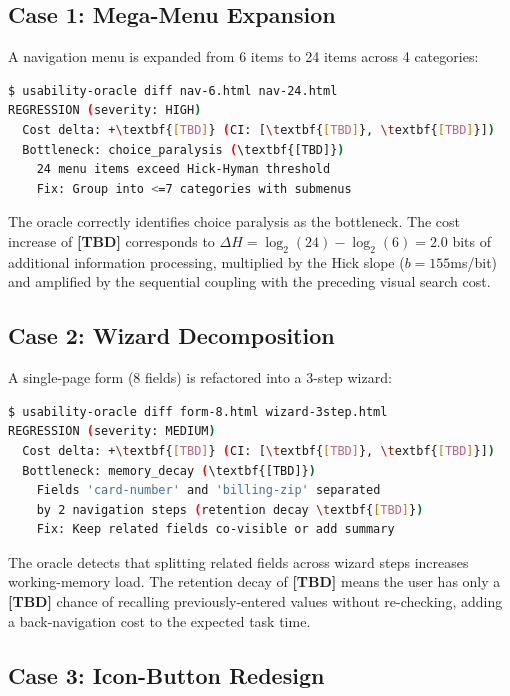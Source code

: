 \documentclass[11pt,twocolumn]{article}
\theoremstyle{definition}
\begin{document}
\subsection{Case 1: Mega-Menu Expansion}

A navigation menu is expanded from 6 items to 24 items across 4 categories:

\begin{lstlisting}[language=bash,numbers=none]
$ usability-oracle diff nav-6.html nav-24.html
REGRESSION (severity: HIGH)
  Cost delta: +\textbf{[TBD]} (CI: [\textbf{[TBD]}, \textbf{[TBD]}])
  Bottleneck: choice_paralysis (\textbf{[TBD]})
    24 menu items exceed Hick-Hyman threshold
    Fix: Group into <=7 categories with submenus
\end{lstlisting}

The oracle correctly identifies choice paralysis as the bottleneck.
The cost increase of \textbf{[TBD]} corresponds to $\Delta H = \log_2(24) - \log_2(6) = 2.0$ bits of additional information processing, multiplied by the Hick slope ($b = 155$ms/bit) and amplified by the sequential coupling with the preceding visual search cost.

\subsection{Case 2: Wizard Decomposition}

A single-page form (8 fields) is refactored into a 3-step wizard:

\begin{lstlisting}[language=bash,numbers=none]
$ usability-oracle diff form-8.html wizard-3step.html
REGRESSION (severity: MEDIUM)
  Cost delta: +\textbf{[TBD]} (CI: [\textbf{[TBD]}, \textbf{[TBD]}])
  Bottleneck: memory_decay (\textbf{[TBD]})
    Fields 'card-number' and 'billing-zip' separated
    by 2 navigation steps (retention decay \textbf{[TBD]})
    Fix: Keep related fields co-visible or add summary
\end{lstlisting}

The oracle detects that splitting related fields across wizard steps increases working-memory load.
The retention decay of \textbf{[TBD]} means the user has only a \textbf{[TBD]} chance of recalling previously-entered values without re-checking, adding a back-navigation cost to the expected task time.

\subsection{Case 3: Icon-Button Redesign}
\end{document}
